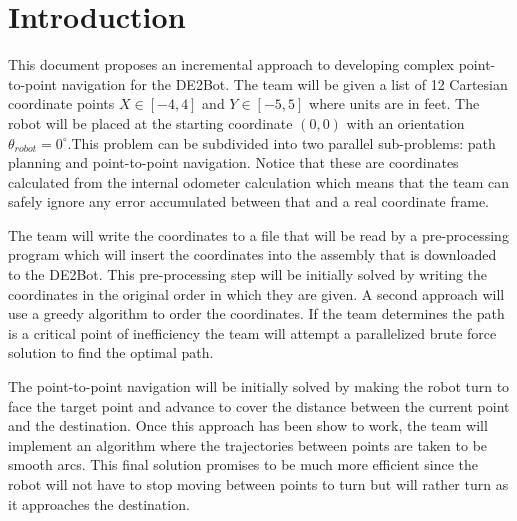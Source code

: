 \documentclass[11pt,conference,onecolumn]{article} %
\begin{document}
\section*{Introduction}
This document proposes an incremental approach to developing complex point-to-point navigation for the DE2Bot. The team will be given a list of 12 Cartesian coordinate points $X \in [-4,4]$ and $Y \in [-5,5]$ where units are in feet. The robot will be placed at the starting coordinate $(0,0)$ with an orientation $\theta_{robot} = 0^{\circ}$.This problem can be subdivided into two parallel sub-problems: path planning and point-to-point navigation. Notice that these are coordinates calculated from the internal odometer calculation which means that the team can safely ignore any error accumulated between that and a real coordinate frame.\par
The team will write the coordinates to a file that will be read by a pre-processing program which will insert the coordinates into the assembly that is downloaded to the DE2Bot. This pre-processing step will be initially solved by writing the coordinates in the original order in which they are given. A second approach will use a greedy algorithm to order the coordinates. If the team determines the path is a critical point of inefficiency the team will attempt a parallelized brute force solution to find the  optimal path.\par
The point-to-point navigation will be initially solved by making the robot turn to face the target point and advance to cover the distance between the current point and the destination. Once this approach has been show to work, the team will implement an algorithm where the trajectories between points are taken to be smooth arcs. This final solution promises to be much more efficient since the robot will not have to stop moving between points to turn but will rather turn as it approaches the destination.\par
\end{document}
